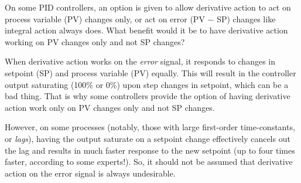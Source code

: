 

On some PID controllers, an option is given to allow derivative action to act on process variable (PV) changes only, or act on error (PV $-$ SP) changes like integral action always does.  What benefit would it be to have derivative action working on PV changes only and not SP changes?







When derivative action works on the {\it error} signal, it responds to changes in setpoint (SP) and process variable (PV) equally.  This will result in the controller output saturating (100\% or 0\%) upon step changes in setpoint, which can be a bad thing.  That is why some controllers provide the option of having derivative action work only on PV changes only and not SP changes.







However, on some processes (notably, those with large first-order time-constants, or {\it lags}), having the output saturate on a setpoint change effectively cancels out the lag and results in much faster response to the new setpoint (up to four times faster, according to some experts!).  So, it should not be assumed that derivative action on the error signal is always undesirable.




